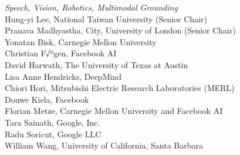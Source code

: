 \emph{Speech, Vision, Robotics, Multimodal Grounding} \\
\hspace*{0.2in} Hung-yi Lee, National Taiwan University (Senior Chair)\\
\hspace*{0.2in} Pranava Madhyastha, City, University of London (Senior Chair)\\
\hspace*{0.2in} Yonatan Bisk, Carnegie Mellon University\\
\hspace*{0.2in} Christian F√ºgen, Facebook AI\\
\hspace*{0.2in} David Harwath, The University of Texas at Austin\\
\hspace*{0.2in} Lisa Anne Hendricks, DeepMind\\
\hspace*{0.2in} Chiori Hori, Mitsubishi Electric Research Laboratories (MERL)\\
\hspace*{0.2in} Douwe Kiela, Facebook\\
\hspace*{0.2in} Florian Metze, Carnegie Mellon University and Facebook AI\\
\hspace*{0.2in} Tara Sainath, Google, Inc.\\
\hspace*{0.2in} Radu Soricut, Google LLC\\
\hspace*{0.2in} William Wang, University of California, Santa Barbara\\

